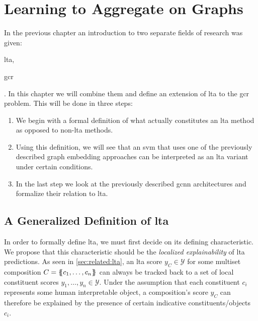 \chapter{Learning to Aggregate on Graphs}%
\label{sec:ltag}

In the previous chapter an introduction to two separate fields of research was given:
\begin{enumerate*}
	\item \Acf{lta},
	\item \Acf{gcr}
\end{enumerate*}.
In this chapter we will combine them and define an extension of \ac{lta} to the \ac{gcr} problem.
This will be done in three steps:
\begin{enumerate}
	\item We begin with a formal definition of what actually constitutes an \ac{lta} method as opposed to non-\acs{lta} methods.
	\item Using this definition, we will see that an \ac{svm} that uses one of the previously described graph embedding approaches can be interpreted as an \ac{lta} variant under certain conditions.
	\item In the last step we look at the previously described \ac{gcnn} architectures and formalize their relation to \ac{lta}.
\end{enumerate}

\section{A Generalized Definition of \acs*{lta}}%
\label{sec:ltag:definition}

In order to formally define \ac{lta}, we must first decide on its defining characteristic.
We propose that this characteristic should be the \textit{localized explainability} of \ac{lta} predictions.
As seen in \cref{sec:related:lta}, an \ac{lta} score $y_{C} \in \mathcal{Y}$ for some multiset composition $C = \ldblbrace c_1, \dots, c_n \rdblbrace$ can always be tracked back to a set of local constituent scores $y_1, \dots, y_n \in \mathcal{Y}$.
Under the assumption that each constituent $c_i$ represents some human interpretable object, a composition's score $y_{C}$ can therefore be explained by the presence of certain indicative constituents/objects $c_i$.

